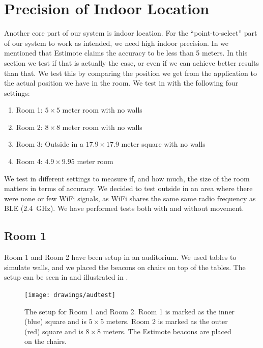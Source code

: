 \section{Precision of Indoor Location}\label{sec:estimoteprecision}
Another core part of our system is indoor location. 
For the ``point-to-select'' part of our system to work as intended, we need high indoor precision. 
In  we mentioned that Estimote claims the accuracy to be less than \num{5} meters.
In this section we test if that is actually the case, or even if we can achieve better results than that. 
We test this by comparing the position we get from the application to the actual position we have in the room. 
We test in with the following four settings:
\begin{enumerate}
    \item Room 1: $5 \times 5$ meter room with no walls
    \item Room 2: $8 \times 8$ meter room with no walls
    \item Room 3: Outside in a $17.9 \times 17.9$ meter square with no walls
    \item Room 4: $4.9 \times 9.95$ meter room
\end{enumerate}

We test in different settings to measure if, and how much, 
the size of the room matters in terms of accuracy. 
We decided to test outside in an area where there were none or few WiFi signals,
as WiFi shares the same same radio frequency as BLE (\SI{2.4}{\GHz}). 
We have performed tests both with and without movement. 

\subsection{Room 1}
Room 1 and Room 2 have been setup in an auditorium. 
We used tables to simulate walls, 
and we placed the beacons on chairs on top of the tables. 
The setup can be seen in  and illustrated in . 

\begin{figure}[!htb]
    \centering
    \texttt{[image: drawings/audtest]}
    \caption{The setup for Room 1 and Room 2. Room 1 is marked as the inner (blue) square and is $5 \times 5$ meters. Room 2 is marked as the outer (red) square and is $8 \times 8$ meters. The Estimote beacons are placed on the chairs.}
    \label{fig:audtest}
\end{figure}

